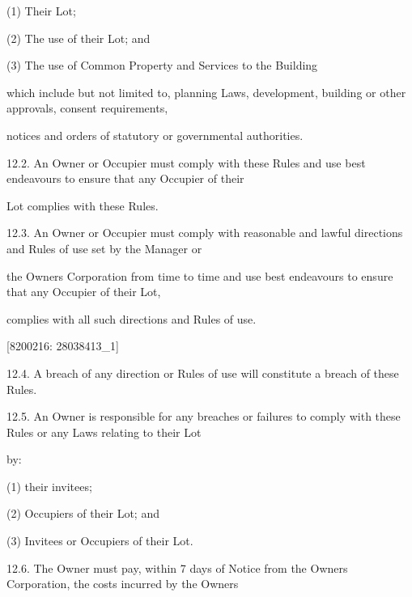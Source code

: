 \documentclass{article}
\begin{document}
{\fontsize{9.962}{1}(1) Their Lot; }

{\fontsize{9.962}{1}(2) The use of their Lot; and }

{\fontsize{9.962}{1}(3) The use of Common Property and Services to the Building }

{\fontsize{10.02}{1}which include but not limited to, planning Laws, development, building or other approvals, consent requirements, }

{\fontsize{10.02}{1}notices and orders of statutory or governmental authorities. }

{\fontsize{9.99}{1}12.2. An Owner or Occupier must comply with these Rules and use best endeavours to ensure that any Occupier of their }

{\fontsize{10.02}{1}Lot complies with these Rules. }

{\fontsize{9.99}{1}12.3. An Owner or Occupier must comply with reasonable and lawful directions and Rules of use set by the Manager or }

{\fontsize{10.02}{1}the Owners Corporation from time to time and use best endeavours to ensure that any Occupier of their Lot, }

{\fontsize{10.02}{1}complies with all such directions and Rules of use. }

\newpage
















{\fontsize{7.02}{1}[8200216: 28038413\_1] }

{\fontsize{9.99}{1}12.4. A breach of any direction or Rules of use will constitute a breach of these Rules. }


{\fontsize{9.99}{1}12.5. An Owner is responsible for any breaches or failures to comply with these Rules or any Laws relating to their Lot }

{\fontsize{10.02}{1}by: }

{\fontsize{9.962}{1}(1) their invitees; }

{\fontsize{9.962}{1}(2) Occupiers of their Lot; and }

{\fontsize{9.962}{1}(3) Invitees or Occupiers of their Lot. }

{\fontsize{9.99}{1}12.6. The Owner must pay, within 7 days of Notice from the Owners Corporation, the costs incurred by the Owners }
\end{document}
